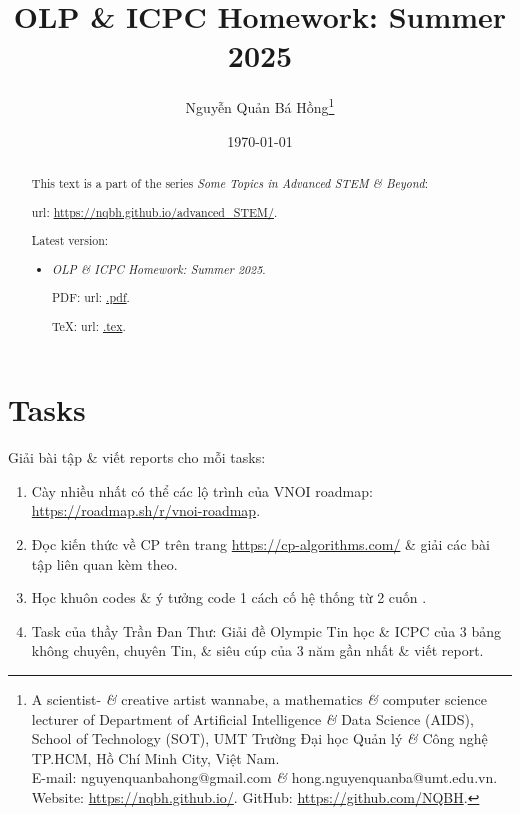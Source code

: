 \documentclass{article}
\title{OLP \& ICPC Homework: Summer 2025}
\author{Nguyễn Quản Bá Hồng\footnote{A scientist- {\it\&} creative artist wannabe, a mathematics {\it\&} computer science lecturer of Department of Artificial Intelligence {\it\&} Data Science (AIDS), School of Technology (SOT), UMT Trường Đại học Quản lý {\it\&} Công nghệ TP.HCM, Hồ Chí Minh City, Việt Nam.\\E-mail: {\sf nguyenquanbahong@gmail.com} {\it\&} {\sf hong.nguyenquanba@umt.edu.vn}. Website: \url{https://nqbh.github.io/}. GitHub: \url{https://github.com/NQBH}.}}
\date{\today}
\begin{document}
\maketitle
\begin{abstract}
    This text is a part of the series {\it Some Topics in Advanced STEM \& Beyond}:
    
    {\sc url}: \url{https://nqbh.github.io/advanced_STEM/}.
    
    Latest version:
    \begin{itemize}
        \item {\it OLP \& ICPC Homework: Summer 2025}.
        
        PDF: {\sc url}: \url{.pdf}.
        
        \TeX: {\sc url}: \url{.tex}.
    \end{itemize}
\end{abstract}
\tableofcontents


\section{Tasks}
Giải bài tập \& viết reports cho mỗi tasks:
\begin{enumerate}
    \item Cày nhiều nhất có thể các lộ trình của VNOI roadmap:  \url{https://roadmap.sh/r/vnoi-roadmap}.
    \item Đọc kiến thức về CP trên trang \url{https://cp-algorithms.com/} \& giải các bài tập liên quan kèm theo.
    \item Học khuôn codes \& ý tưởng code 1 cách cố hệ thống từ 2 cuốn \cite{Wu_Wang2016, Wu_Wang2018}.
    \item Task của thầy {\sc Trần Đan Thư}: Giải đề Olympic Tin học \& ICPC của 3 bảng không chuyên, chuyên Tin, \& siêu cúp của 3 năm gần nhất \& viết report.
\end{enumerate}

\end{document}
